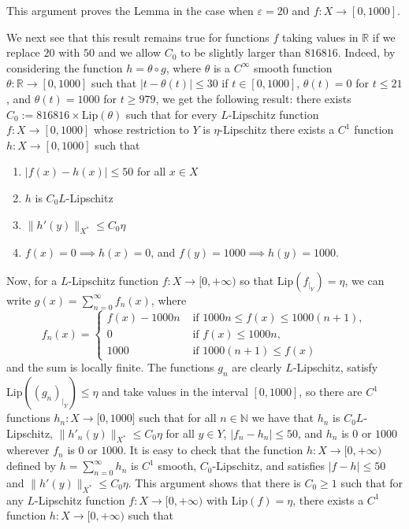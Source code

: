 \documentclass[11pt]{amsproc}%
\theoremstyle{plain}
\numberwithin{equation}{section}
\begin{document}
This argument proves the Lemma in the case when $\varepsilon=20$
and $f:X\to [0, 1000]$.

We next see that this result remains true for functions $f$ taking
values in $\mathbb{R}$ if we replace $20$ with $50$ and we allow
$C_0$ to be slightly larger than $816816$. Indeed, by considering
the function $h=\theta\circ g$, where $\theta$ is a $C^{\infty}$
smooth function $\theta:\mathbb{R}\to[0,1000]$ such that
$|t-\theta(t)|\leq 30$ if $t\in[0, 1000]$, $\theta(t)=0$ for
$t\leq 21$, and $\theta(t)=1000$ for $t\geq 979$, we get the
following result: there exists $C_{0}:=816816\times
\text{Lip}(\theta)$ such that for every $L$-Lipschitz function
$f:X\to[0,1000]$ whose restriction to $Y$ is $\eta$-Lipschitz
there exists a $C^{1}$ function $h:X\to[0,1000]$ such that

\begin{enumerate}
\item $|f(x)-h(x)|\leq 50$ for all $x\in X$

\item $h$ is $C_{0} L$-Lipschitz

\item $\|h'(y)\|_{X^{*}}\leq C_0 \eta$

\item $f(x)=0 \implies h(x)=0$, and $f(y)=1000 \implies h(y)=1000$.
\end{enumerate}

Now, for a $L$-Lipschitz function
$f:X\rightarrow\lbrack0,+\infty)$ so that
$\textrm{Lip}(f_{|_Y})=\eta$, we can write
$g(x)=\sum_{n=0}^{\infty}f_{n}(x)$, where
\[
f_{n}(x)=%
\begin{cases}
f(x)-1000n & \text{ if }1000n\leq f(x)\leq1000(n+1),\\
0 & \text{ if }f(x)\leq1000n,\\
1000 & \text{ if }1000(n+1)\leq f(x)
\end{cases}
\]
and the sum is locally finite. The functions $g_{n}$ are clearly
$L$-Lipschitz, satisfy $\textrm{Lip}((g_n)_{|_Y})\leq\eta$ and
take values in the interval $[0,1000]$, so there are $C^{1}$
functions $h_{n}:X\rightarrow\lbrack0,1000]$ such that for all
$n\in\mathbb{N}$ we have that $h_{n}$ is $C_{0} L$-Lipschitz,
$\|h'_n(y)\|_{X^{*}}\leq C_0 \eta$ for all $y\in Y$,
$|f_{n}-h_{n}|\leq 50$, and $h_{n}$ is $0$ or $1000$ wherever
$f_{n}$ is $0$ or $1000$. It is easy to check that the function
$h:X\rightarrow\lbrack0,+\infty)$ defined by
$h=\sum_{n=0}^{\infty}h_{n}$ is $C^{1}$ smooth, $C_{0}$-Lipschitz,
and satisfies $|f-h|\leq 50$ and $\|h'(y)\|_{X^{*}}\leq C_0 \eta$.
This argument shows that there is $C_{0}\geq1$ such that for any
$L$-Lipschitz function $f:X\rightarrow\mathbb{[}0,+\infty)$ with
$\textrm{Lip}(f)=\eta$, there exists a $C^{1}$ function
$h:X\rightarrow\lbrack0,+\infty)$ such that
\end{document}
